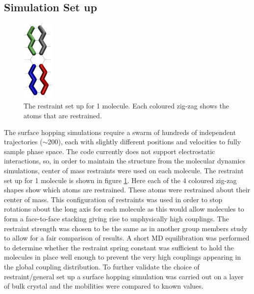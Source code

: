 \subsection{Simulation Set up}
\begin{figure}
	\vspace*{-0.7cm}
	\centering
	\includegraphics[width=0.14\textwidth]{./img/RestraintsPos.png}
	\caption{\label{fig:rest}The restraint set up for 1 molecule. Each coloured zig-zag shows the atoms that are restrained.}
\end{figure}
\vspace*{0.5cm}
The surface hopping simulations require a swarm of hundreds of independent trajectories ($\sim$200), each with slightly different positions and velocities to fully sample phase space. The code currently does not support electrostatic interactions, so, in order to maintain the structure from the molecular dynamics simulations, center of mass restraints were used on each molecule. The restraint set up for 1 molecule is shown in figure \ref{fig:rest}. Here each of the 4 coloured zig-zag shapes show which atoms are restrained. These atoms were restrained about their center of mass. This configuration of restraints was used in order to stop rotations about the long axis for each molecule as this would allow molecules to form a face-to-face stacking giving rise to unphysically high couplings. The restraint strength was chosen to be the same as in another group members study to allow for a fair comparison of results. A short MD equilibration was performed to determine whether the restraint spring constant was sufficient to hold the molecules in place well enough to prevent the very high couplings appearing in the global coupling distribution. To further validate the choice of restraint/general set up a surface hopping simulation was carried out on a layer of bulk crystal and the mobilities were compared to known values.
\\\\
